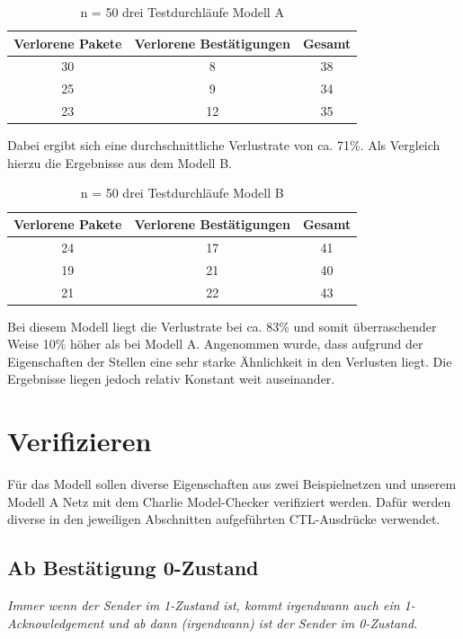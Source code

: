 \documentclass[]{scrartcl}
\begin{document}
\begin{table}[H]
\centering
\begin{tabular}{|c|c|c|}
  \hline
  \textbf{Verlorene Pakete} & \textbf{Verlorene Bestätigungen} & \textbf{Gesamt}\\
  \hline
   30 & 8 & 38\\
  \hline
   25 & 9 & 34\\
  \hline
   23 & 12 & 35\\
  \hline
\end{tabular}
	\caption{n = 50 drei Testdurchläufe Modell A}
\end{table}

Dabei ergibt sich eine durchschnittliche Verlustrate von ca. 71\%. Als Vergleich hierzu die Ergebnisse aus dem Modell B.

\begin{table}[H]
\centering
\begin{tabular}{|c|c|c|}
  \hline
  \textbf{Verlorene Pakete} & \textbf{Verlorene Bestätigungen} & \textbf{Gesamt}\\
  \hline
   24 & 17 & 41\\
  \hline
   19 & 21 & 40\\
  \hline
   21 & 22 & 43\\
  \hline
\end{tabular}
	\caption{n = 50 drei Testdurchläufe Modell B}
\end{table}

Bei diesem Modell liegt die Verlustrate bei ca. 83\% und somit überraschender Weise 10\% höher als bei Modell A. Angenommen wurde, dass aufgrund der Eigenschaften der Stellen eine sehr starke Ähnlichkeit in den Verlusten liegt. Die Ergebnisse liegen jedoch relativ Konstant weit auseinander.

\section{Verifizieren}
Für das Modell sollen diverse Eigenschaften aus zwei Beispielnetzen und unserem Modell A Netz mit dem Charlie Model-Checker verifiziert werden. Dafür werden diverse in den jeweiligen Abschnitten aufgeführten CTL-Ausdrücke verwendet.
 
\subsection{Ab Bestätigung 0-Zustand}

\textit{Immer wenn der Sender im 1-Zustand ist, kommt irgendwann auch ein 1-Acknowledgement
und ab dann (irgendwann) ist der Sender im 0-Zustand.}\\
\end{document}
